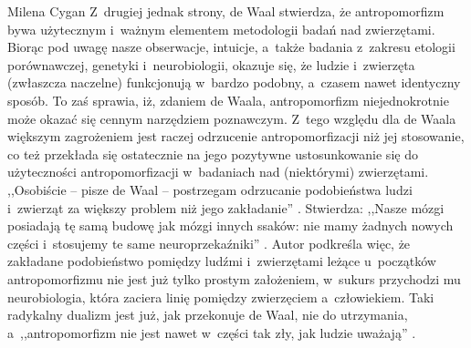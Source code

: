 \begin{newrevplenv}{Milena Cygan}
Z~drugiej jednak strony, de Waal stwierdza, że antropomorfizm bywa użytecznym i~ważnym elementem metodologii badań nad zwierzętami. Biorąc pod uwagę nasze obserwacje, intuicje, a~także badania z~zakresu etologii porównawczej, genetyki i~neurobiologii, okazuje się, że ludzie i~zwierzęta (zwłaszcza naczelne) funkcjonują w~bardzo podobny, a~czasem nawet identyczny sposób. To zaś sprawia, iż, zdaniem de Waala, antropomorfizm niejednokrotnie może okazać się cennym narzędziem poznawczym. Z~tego względu dla de Waala większym zagrożeniem jest raczej odrzucenie antropomorfizacji niż jej stosowanie, co też przekłada się ostatecznie na jego pozytywne ustosunkowanie się do użyteczności antropomorfizacji w~badaniach nad (niektórymi) zwierzętami. ,,Osobiście -- pisze de Waal -- postrzegam odrzucanie podobieństwa ludzi i~zwierząt za większy problem niż jego zakładanie''
\parencite[][s.~64]{waal_ostatni_2019}. %
 Stwierdza: ,,Nasze mózgi posiadają tę samą budowę jak mózgi innych ssaków: nie mamy żadnych nowych części i~stosujemy te same neuroprzekaźniki'' 
\parencite[][s.~65]{waal_ostatni_2019}. %
 Autor podkreśla więc, że zakładane podobieństwo pomiędzy ludźmi i~zwierzętami leżące u~początków antropomorfizmu nie jest już tylko prostym założeniem, w~sukurs przychodzi mu neurobiologia, która zaciera linię pomiędzy zwierzęciem a~człowiekiem. Taki radykalny dualizm jest już, jak przekonuje de Waal, nie do utrzymania, a~,,antropomorfizm nie jest nawet w~części tak zły, jak ludzie uważają'' 
\parencite[][s.~65]{waal_ostatni_2019}.%



\end{newrevplenv}
